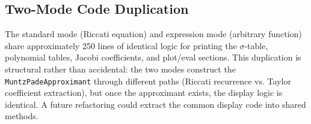 \documentclass[a4paper,11pt]{article}
\begin{document}
\subsection{Two-Mode Code Duplication}

The standard mode (Riccati equation) and expression mode (arbitrary function)
share approximately 250 lines of identical logic for printing the
$\sigma$-table, polynomial tables, Jacobi coefficients, and plot/eval sections.
This duplication is structural rather than accidental: the two modes construct
the \texttt{MuntzPadeApproximant} through different paths (Riccati recurrence
vs. Taylor coefficient extraction), but once the approximant exists, the
display logic is identical. A future refactoring could extract the common
display code into shared methods.
\end{document}
